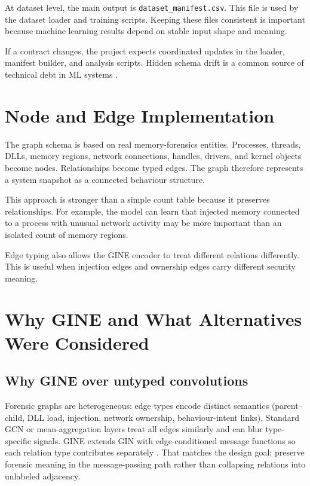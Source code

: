 At dataset level, the main output is \texttt{dataset\_manifest.csv}. This file is used by the dataset loader and training scripts. Keeping these files consistent is important because machine learning results depend on stable input shape and meaning.

If a contract changes, the project expects coordinated updates in the loader, manifest builder, and analysis scripts. Hidden schema drift is a common source of technical debt in ML systems \cite{sculley2015debt}.

\section{Node and Edge Implementation}

The graph schema is based on real memory-forensics entities. Processes, threads, DLLs, memory regions, network connections, handles, drivers, and kernel objects become nodes. Relationships become typed edges. The graph therefore represents a system snapshot as a connected behaviour structure.

This approach is stronger than a simple count table because it preserves relationships. For example, the model can learn that injected memory connected to a process with unusual network activity may be more important than an isolated count of memory regions.

Edge typing also allows the GINE encoder to treat different relations differently. This is useful when injection edges and ownership edges carry different security meaning.

\section{Why GINE and What Alternatives Were Considered}

\subsection{Why GINE over untyped convolutions}

Forensic graphs are heterogeneous: edge types encode distinct semantics (parent--child, DLL load, injection, network ownership, behaviour-intent links). Standard GCN or mean-aggregation layers treat all edges similarly and can blur type-specific signals. GINE extends GIN with edge-conditioned message functions so each relation type contributes separately \cite{xu2019gin}. That matches the design goal: preserve forensic meaning in the message-passing path rather than collapsing relations into unlabeled adjacency.

